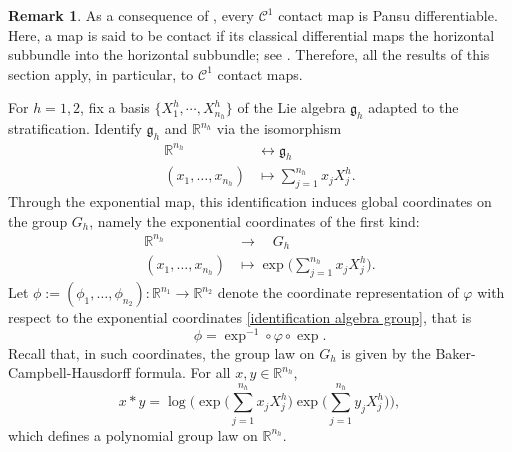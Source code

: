 \documentclass[dvipsnames]{amsart}
\theoremstyle{definition}
\newtheorem{remark}[theorem]{Remark}
\theoremstyle{definition}
\numberwithin{equation}{section}
\begin{document}
\begin{remark}
As a consequence of \cite[Theorem 1.1]{Magnani_2013}, every $\mathcal{C}^1$ contact map is Pansu differentiable. Here, a map is said to be contact if its classical differential maps the horizontal subbundle into the horizontal subbundle; see \cite[Definition 2.9]{Magnani_2013}. Therefore, all the results of this section apply, in particular, to $\mathcal{C}^1$ contact maps.
\end{remark}

For $h=1,2$, fix a basis $\{X_1^h, \cdots, X_{n_h}^h\}$ of the Lie algebra $\mathfrak{g}_h$ adapted to the stratification. Identify $\mathfrak{g}_h$ and $\mathbb{R}^{n_h}$ via the isomorphism 
\begin{align*}
    \mathbb{R}^{n_h} &\longleftrightarrow \mathfrak{g}_h\\
    (x_1, \ldots, x_{n_h}) &\longmapsto \sum_{j = 1}^{n_h} x_j X_j^h.
\end{align*}
Through the exponential map, this identification induces global coordinates on the group $G_h$, namely the exponential coordinates of the first kind:
\begin{equation}\label{identification algebra group}
    \begin{aligned}
    \mathbb{R}^{n_h}\quad &\longrightarrow \quad G_h\\
    (x_1, \ldots, x_{n_h}) &\longmapsto \exp \big ( \sum_{j=1}^{n_h} x_j X_j^h\big ).
\end{aligned}
\end{equation}
Let $\phi := (\phi_1, \ldots, \phi_{n_2}) : \mathbb{R}^{n_1} \rightarrow \mathbb{R}^{n_2}$ denote the coordinate representation of $\varphi$ with respect to the exponential coordinates \eqref{identification algebra group}, that is 
\begin{equation*}
    \phi = \exp^{-1} \circ \varphi \circ \exp.
\end{equation*}
Recall that, in such coordinates, the group law on $G_h$ is given by the Baker-Campbell-Hausdorff formula. For all $x,y \in \mathbb R^{n_h}$,
\begin{equation*}
    x*y = \log \Big ( \exp \big ( \sum_{j=1}^{n_h} x_j X_j^h\big ) \exp \big ( \sum_{j=1}^{n_h} y_j X_j^h\big ) \Big ),
\end{equation*}
which defines a polynomial group law on $\mathbb R^{n_h}$.
\end{document}
